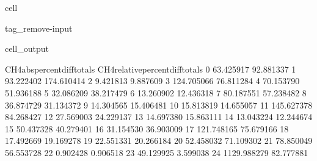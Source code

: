 \documentclass[letterpaper,10pt,english]{jupyterBook}
\begin{document}
\begin{sphinxuseclass}{cell}
\begin{sphinxuseclass}{tag_remove-input}
\begin{sphinxVerbatimOutput}
\begin{sphinxuseclass}{cell_output}
\begin{sphinxVerbatim}[commandchars=\\\{\}]
    CH4\PYGZus{}abs\PYGZus{}percent\PYGZus{}diff\PYGZus{}totals  CH4\PYGZus{}relative\PYGZus{}percent\PYGZus{}diff\PYGZus{}totals  \PYGZbs{}
0                     63.425917                        \PYGZhy{}92.881337   
1                     93.222402                       \PYGZhy{}174.610414   
2                      9.421813                         \PYGZhy{}9.887609   
3                    124.705066                         76.811284   
4                     70.153790                         51.936188   
5                     32.086209                        \PYGZhy{}38.217479   
6                     13.260902                         12.436318   
7                     80.187551                         57.238482   
8                     36.874729                         31.134372   
9                     14.304565                        \PYGZhy{}15.406481   
10                    15.813819                         14.655057   
11                   145.627378                         84.268427   
12                    27.569003                         24.229137   
13                    14.697380                        \PYGZhy{}15.863111   
14                    13.043224                         12.244674   
15                    50.437328                         40.279401   
16                    31.154530                        \PYGZhy{}36.903009   
17                   121.748165                         75.679166   
18                    17.492669                        \PYGZhy{}19.169278   
19                    22.551331                         20.266184   
20                    52.458032                        \PYGZhy{}71.109302   
21                    78.850049                         56.553728   
22                     0.902428                         \PYGZhy{}0.906518   
23                    49.129925                          3.599038   
24                  1129.988279                         82.777881   


\end{sphinxVerbatim}
\end{sphinxuseclass}
\end{sphinxVerbatimOutput}
\end{sphinxuseclass}
\end{sphinxuseclass}
\end{document}
